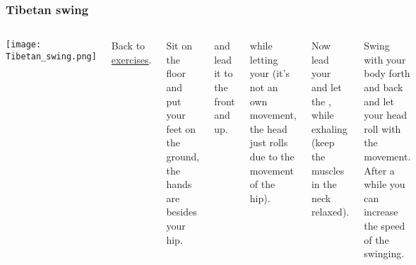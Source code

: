 \begin{frame}
\frametitle{Tibetan swing}
\hypertarget{hemi}{}
\begin{columns}[c] %

	\texttt{[image: Tibetan\_swing.png]}


\vspace{3cm}
Back to \href{run:./Exercises.pdf}{\underline{exercises}}.


Sit on the floor and put your feet on the ground, the hands are besides your hip.

 and lead it to the front and up.

 while letting your  (it's not an own movement, the head just rolls due to the movement of the hip).

Now lead your  and let the , while exhaling (keep the muscles in the neck relaxed).

Swing with your body forth and back and let your head roll with the movement. After a while you can increase the speed of the swinging.


\end{columns}
\end{frame}
